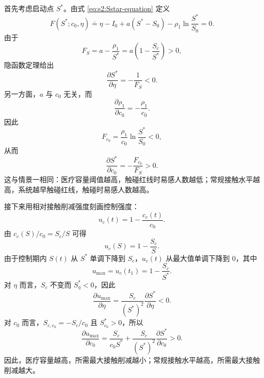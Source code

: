 首先考虑启动点 $S^*$。由式 \eqref{eq:s2:Sstar-equation} 定义
\begin{equation}
F(S^*;c_0,\eta)
\doteq
\eta-I_0+a(S^*-S_0)-\rho_1\ln\frac{S^*}{S_0}
=0.
\label{eq:s2:F-Sstar}
\end{equation}
由于
\begin{equation}
F_S
=
a-\frac{\rho_1}{S^*}
=
a\left(1-\frac{S_c}{S^*}\right)>0,
\end{equation}
隐函数定理给出
\begin{equation}
\frac{\partial S^*}{\partial\eta}
=
-\frac{1}{F_S}<0.
\label{eq:s2:Sstar-eta-sign}
\end{equation}
另一方面，$a$ 与 $c_0$ 无关，而
\[
\frac{\partial\rho_1}{\partial c_0}
=
-\frac{\rho_1}{c_0}.
\]
因此
\begin{equation}
F_{c_0}
=
\frac{\rho_1}{c_0}\ln\frac{S^*}{S_0}<0,
\end{equation}
从而
\begin{equation}
\frac{\partial S^*}{\partial c_0}
=
-\frac{F_{c_0}}{F_S}>0.
\label{eq:s2:Sstar-c0-sign}
\end{equation}
这与情景一相同：医疗容量阈值越高，触碰红线时易感人数越低；常规接触水平越高，系统越早触碰红线，触碰时易感人数越高。

接下来用相对接触削减强度刻画控制强度：
\begin{equation}
u_c(t)
=
1-\frac{c_c(t)}{c_0}.
\end{equation}
由 $c_c(S)/c_0=S_c/S$ 可得
\begin{equation}
u_c(S)
=
1-\frac{S_c}{S}.
\label{eq:s2:u-state}
\end{equation}
由于控制期内 $S(t)$ 从 $S^*$ 单调下降到 $S_c$，$u_c(t)$ 从最大值单调下降到 $0$，其中
\begin{equation}
u_{\max}
=
u_c(t_1)
=
1-\frac{S_c}{S^*}.
\label{eq:s2:umax}
\end{equation}
对 $\eta$ 而言，$S_c$ 不变而 $S^*_\eta<0$，因此
\begin{equation}
\frac{\partial u_{\max}}{\partial\eta}
=
\frac{S_c}{(S^*)^2}\frac{\partial S^*}{\partial\eta}<0.
\end{equation}
对 $c_0$ 而言，$S_{c,c_0}=-S_c/c_0$ 且 $S^*_{c_0}>0$，所以
\begin{equation}
\frac{\partial u_{\max}}{\partial c_0}
=
\frac{S_c}{c_0S^*}
+
\frac{S_c}{(S^*)^2}
\frac{\partial S^*}{\partial c_0}>0.
\end{equation}
因此，医疗容量越高，所需最大接触削减越小；常规接触水平越高，所需最大接触削减越大。

